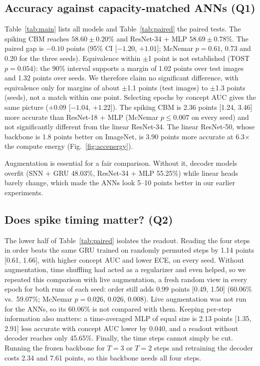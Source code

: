 \documentclass[conference]{IEEEtran}
\begin{document}
\subsection{Accuracy against capacity-matched ANNs (Q1)}
Table~\ref{tab:main} lists all models and Table~\ref{tab:paired} the paired tests. The spiking CBM reaches $58.60\pm0.20$\% and ResNet-34 + MLP $58.69\pm0.78$\%. The paired gap is $-0.10$ points (95\% CI [$-1.20$, $+1.01$]; McNemar $p=0.61$, 0.73 and 0.20 for the three seeds). Equivalence within $\pm$1 point is not established (TOST $p=0.054$): the 90\% interval supports a margin of 1.02 points over test images and 1.32 points over seeds. We therefore claim no significant difference, with equivalence only for margins of about $\pm$1.1 points (test images) to $\pm$1.3 points (seeds), not a match within one point. Selecting epochs by concept AUC gives the same picture ($+0.09$ [$-1.04$, $+1.22$]). The spiking CBM is 2.36 points [1.24, 3.46] more accurate than ResNet-18 + MLP (McNemar $p\le0.007$ on every seed) and not significantly different from the linear ResNet-34. The linear ResNet-50, whose backbone is 1.8 points better on ImageNet, is 3.90 points more accurate at 6.3$\times$ the compute energy (Fig.~\ref{fig:accenergy}).

Augmentation is essential for a fair comparison. Without it, decoder models overfit (SNN + GRU 48.03\%, ResNet-34 + MLP 55.25\%) while linear heads barely change, which made the ANNs look 5--10 points better in our earlier experiments.

\subsection{Does spike timing matter? (Q2)}\label{sec:timing}
The lower half of Table~\ref{tab:paired} isolates the readout. Reading the four steps in order beats the same GRU trained on randomly permuted steps by 1.14 points [0.61, 1.66], with higher concept AUC and lower ECE, on every seed. Without augmentation, time shuffling had acted as a regularizer and even helped, so we repeated this comparison with live augmentation, a fresh random view in every epoch for both runs of each seed: order still adds 0.99 points [0.49, 1.50] (60.06\% vs.\ 59.07\%; McNemar $p=0.026$, 0.026, 0.008). Live augmentation was not run for the ANNs, so its 60.06\% is not compared with them. Keeping per-step information also matters: a time-averaged MLP of equal size is 2.13 points [1.35, 2.91] less accurate with concept AUC lower by 0.040, and a readout without decoder reaches only 45.65\%. Finally, the time steps cannot simply be cut. Running the frozen backbone for $T=3$ or $T=2$ steps and retraining the decoder costs 2.34 and 7.61 points, so this backbone needs all four steps.
\end{document}
